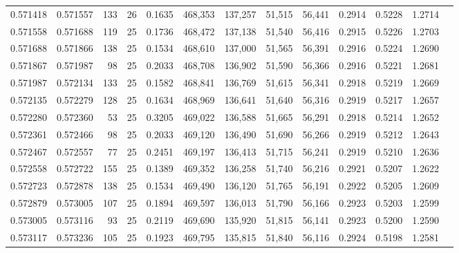 \begin{tabular}{rrrrrrrrrrrrr}
0.571418 & 0.571557 &   133 &  26 &                                     0.1635 & 468,353 & 137,257 &  51,515 &  56,441 & 0.2914 & 0.5228 & 1.2714 \\
0.571558 & 0.571688 &   119 &  25 &                                     0.1736 & 468,472 & 137,138 &  51,540 &  56,416 & 0.2915 & 0.5226 & 1.2703 \\
0.571688 & 0.571866 &   138 &  25 &                                     0.1534 & 468,610 & 137,000 &  51,565 &  56,391 & 0.2916 & 0.5224 & 1.2690 \\
0.571867 & 0.571987 &    98 &  25 &                                     0.2033 & 468,708 & 136,902 &  51,590 &  56,366 & 0.2916 & 0.5221 & 1.2681 \\
0.571987 & 0.572134 &   133 &  25 &                                     0.1582 & 468,841 & 136,769 &  51,615 &  56,341 & 0.2918 & 0.5219 & 1.2669 \\
0.572135 & 0.572279 &   128 &  25 &                                     0.1634 & 468,969 & 136,641 &  51,640 &  56,316 & 0.2919 & 0.5217 & 1.2657 \\
0.572280 & 0.572360 &    53 &  25 &                                     0.3205 & 469,022 & 136,588 &  51,665 &  56,291 & 0.2918 & 0.5214 & 1.2652 \\
0.572361 & 0.572466 &    98 &  25 &                                     0.2033 & 469,120 & 136,490 &  51,690 &  56,266 & 0.2919 & 0.5212 & 1.2643 \\
0.572467 & 0.572557 &    77 &  25 &                                     0.2451 & 469,197 & 136,413 &  51,715 &  56,241 & 0.2919 & 0.5210 & 1.2636 \\
0.572558 & 0.572722 &   155 &  25 &                                     0.1389 & 469,352 & 136,258 &  51,740 &  56,216 & 0.2921 & 0.5207 & 1.2622 \\
0.572723 & 0.572878 &   138 &  25 &                                     0.1534 & 469,490 & 136,120 &  51,765 &  56,191 & 0.2922 & 0.5205 & 1.2609 \\
0.572879 & 0.573005 &   107 &  25 &                                     0.1894 & 469,597 & 136,013 &  51,790 &  56,166 & 0.2923 & 0.5203 & 1.2599 \\
0.573005 & 0.573116 &    93 &  25 &                                     0.2119 & 469,690 & 135,920 &  51,815 &  56,141 & 0.2923 & 0.5200 & 1.2590 \\
0.573117 & 0.573236 &   105 &  25 &                                     0.1923 & 469,795 & 135,815 &  51,840 &  56,116 & 0.2924 & 0.5198 & 1.2581 \\

\end{tabular}
